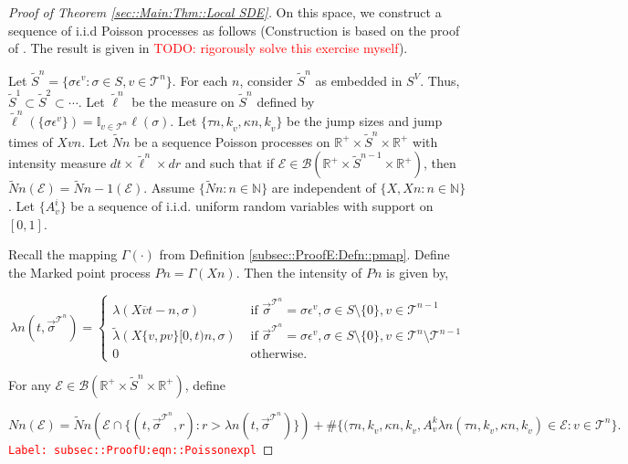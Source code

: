 \documentclass[12pt]{article}
\newcommand{\mb}{\mathbb}
\newcommand{\mc}{\mathcal}
\newcommand{\ms}{\mathscr}
\newcommand{\ov}{\overline}
\newcommand{\te}{\text}
\newcommand{\ep}{\epsilon}
\newcommand{\tr}{\textcolor{red}}
\newcommand{\labe}[1]{\tr{\texttt{Label: #1}}}
\newcommand{\ind}{\hspace{24pt}}
\renewcommand{\v}{v}							%
\renewcommand{\S}{S}							%
\newcommand{\s}{\sigma}							%
\newcommand{\sv}{\vec{\s}}						%
\newcommand{\ev}{\ep}							%
\renewcommand{\t}{t}							%
\newcommand{\X}{X}								%
\newcommand{\vind}[1]{^{#1}}					%
\newcommand{\carp}[1]{^{#1}}					%
\newcommand{\vsi}[1]{^{#1}}						%
\newcommand{\cind}[1]{_{#1}}					%
\newcommand{\cl}{\ov}							%
\newcommand{\tree}{\mc{T}}						%
\newcommand{\sln}[1]{^{#1}}						%
\newcommand{\poiss}{N}							%
\newcommand{\Sm}{\ell}							%
\newcommand{\rate}{\lambda}						%
\renewcommand{\r}{r}							%
\newcommand{\alt}[1]{\widetilde{#1}}			%
\newcommand{\rt}{\tau}							%
\renewcommand{\it}{k}							%
\newcommand{\evnt}{\mc{E}}						%
\newcommand{\rv}{A}								%
\newcommand{\pmap}{\Gamma}						%
\renewcommand{\mark}{\kappa}					%
\newcommand{\rp}{P}								%
\newcommand{\crate}{\alt{\lambda}}				%
\newcommand{\p}{p}								%
\begin{document}
\begin{proof}[Proof of Theorem \ref{sec::Main:Thm::Local SDE}]
\ind On this space, we construct a sequence of i.i.d Poisson processes as follows (Construction is based on the proof of \cite[Theorem 14.7.1(b)]{DalVer08}. The result is given in \cite[Exercise 14.7.1]{DalVer08} \tr{TODO: rigorously solve this exercise myself}).

\ind Let \(\alt{\S}^n = \{\s\ev\vind{\v}: \s\in\S,\v \in \tree\sln{n}\}\). For each \(n\), consider \(\alt{\S}^n\) as embedded in \(\S\carp{V}\). Thus, \(\alt{\S}^1 \subset \alt{\S}^2 \subset \cdots\). Let \(\alt{\Sm}\sln{n}\) be the measure on \(\alt{\S}^n\) defined by \(\alt{\Sm}\sln{n}(\{\s\ev\vind{\v}\}) = \mb{I}_{\v \in \tree\sln{n}}\Sm(\s)\). Let \(\{\rt{n,\it}_\v,\mark{n,\it}_{\v}\}\) be the jump sizes and jump times of \(\X{\v}{}{n}\). Let \(\alt{\poiss}{n}\) be a sequence Poisson processes on \(\mb{R}^+\times\alt{\S}^n\times \mb{R}^+\) with intensity measure \(d\t\times\alt{\Sm}^n\times d\r\) and such that if \(\evnt{} \in \ms{B}(\mb{R}^+\times\alt{\S}^{n-1}\times \mb{R}^+)\), then \(\alt{\poiss}{n}(\evnt{}) = \alt{\poiss}{n-1}(\evnt{})\). Assume \(\{\alt{\poiss}{n}:n\in\mb{N}\}\) are independent of \(\{\X{}{},\X{}{}{n}:n\in\mb{N}\}\). Let \(\{\rv_{\v}^{i}\}\) be a sequence of i.i.d. uniform random variables with support on \([0,1]\).

\ind Recall the mapping \(\pmap{}(\cdot)\) from Definition \ref{subsec::ProofE:Defn::pmap}. Define the Marked point process \(\rp{n} = \pmap{}(\X{}{}{n})\). Then the intensity of \(\rp{n}\) is given by,

\[\rate{n}(\t,\sv\cind{}\vsi{\tree\sln{n}}) = \begin{cases}
\rate{}(\X{\cl{\v}}{\t-}{n},\s) &\te{ if } \sv\cind{}\vsi{\tree\sln{n}} = \s\ev\vind{\v},\s \in \S\setminus\{0\},\v\in\tree\sln{n-1}\\
\crate{}{}(\X{\{\v,\p{\v}\}}{[0,\t)}{n},\s) &\te{ if } \sv\cind{}\vsi{\tree\sln{n}} = \s\ev\vind{\v},\s\in\S\setminus\{0\},\v\in\tree\sln{n}\setminus\tree\sln{n-1}\\
0 &\te{ otherwise.}
\end{cases}\]

For any \(\evnt{} \in \ms{B}(\mb{R}^+\times\alt{\S}^n\times\mb{R}^+)\), define

\begin{equation}
\poiss{n}(\evnt{}) = \alt{\poiss}{n}\left(\evnt{}\cap\{(\t,\sv\cind{}\vsi{\tree\sln{n}},\r):\r > \rate{n}(\t,\sv\cind{}\vsi{\tree\sln{n}})\}\right) + \#\{(\rt{n,\it}_\v,\mark{n,\it}_\v,\rv_{\v}^{\it}\rate{n}(\rt{n,\it}_\v,\mark{n,\it}_\v) \in \evnt{}: \v\in \tree\sln{n}\}.
\label{subsec::ProofU:eqn::Poissonexpl}
\end{equation}
\labe{subsec::ProofU:eqn::Poissonexpl}


\end{proof}
\end{document}
